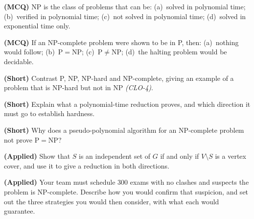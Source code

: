\begin{reviewq}
  \item \textbf{(MCQ)} NP is the class of problems that can be:
        (a)~solved in polynomial time; (b)~verified in polynomial time;
        (c)~not solved in polynomial time; (d)~solved in exponential time only.
  \item \textbf{(MCQ)} If an NP-complete problem were shown to be in P, then:
        (a)~nothing would follow; (b)~$\mathrm{P}=\mathrm{NP}$;
        (c)~$\mathrm{P}\ne\mathrm{NP}$; (d)~the halting problem would be
        decidable.
  \item \textbf{(Short)} Contrast P, NP, NP-hard and NP-complete, giving an
        example of a problem that is NP-hard but not in NP \emph{(CLO-4)}.
  \item \textbf{(Short)} Explain what a polynomial-time reduction proves, and
        which direction it must go to establish hardness.
  \item \textbf{(Short)} Why does a pseudo-polynomial algorithm for an
        NP-complete problem not prove $\mathrm{P}=\mathrm{NP}$?
  \item \textbf{(Applied)} Show that $S$ is an independent set of $G$ if and
        only if $V \setminus S$ is a vertex cover, and use it to give a
        reduction in both directions.
  \item \textbf{(Applied)} Your team must schedule 300 exams with no clashes and
        suspects the problem is NP-complete. Describe how you would confirm
        that suspicion, and set out the three strategies you would then
        consider, with what each would guarantee.
\end{reviewq}
